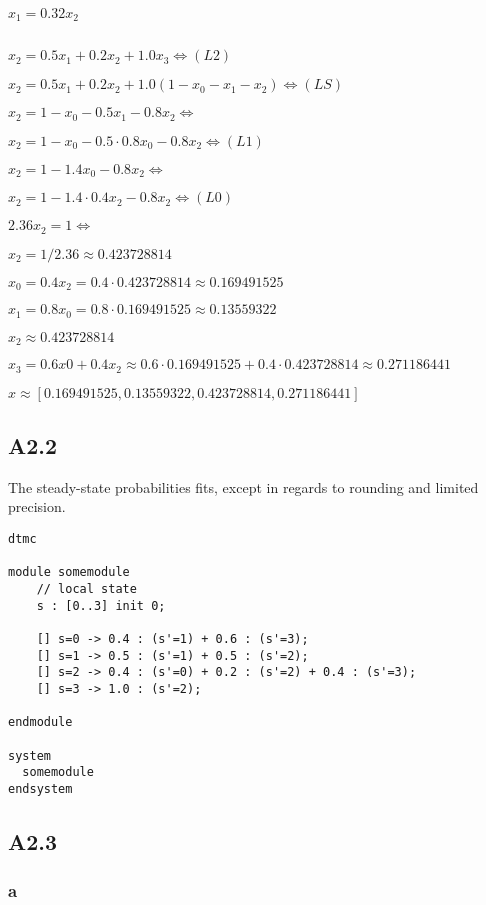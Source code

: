 $x_1 = 0.32x_2$

$ $

$x_2 = 0.5x_1 + 0.2x_2 + 1.0x_3 \Leftrightarrow   (L2)$

$x_2 = 0.5x_1 + 0.2x_2 + 1.0(1 - x_0 - x_1 - x_2) \Leftrightarrow   (LS)$

$x_2 = 1 - x_0 - 0.5x_1 - 0.8x_2 \Leftrightarrow$

$x_2 = 1 - x_0 - 0.5\cdot0.8x_0 - 0.8x_2 \Leftrightarrow   (L1)$

$x_2 = 1 - 1.4x_0 - 0.8x_2 \Leftrightarrow$

$x_2 = 1 - 1.4\cdot0.4x_2 - 0.8x_2 \Leftrightarrow   (L0)$

$2.36x_2 = 1 \Leftrightarrow$

$x_2 = 1/2.36 \approx 0.423728814$

$x_0 = 0.4x_2 = 0.4\cdot0.423728814 \approx 0.169491525$

$x_1 = 0.8x_0 = 0.8\cdot0.169491525 \approx 0.13559322$

$x_2 \approx 0.423728814$

$x_3 = 0.6x0 + 0.4x_2 \approx 0.6\cdot0.169491525 + 0.4\cdot0.423728814 \approx 0.271186441$

$x \approx [0.169491525, 0.13559322, 0.423728814, 0.271186441]$

\subsection{A2.2}

The steady-state probabilities fits, except in regards to rounding
and limited precision.

\begin{verbatim}
dtmc

module somemodule
	// local state
	s : [0..3] init 0;
	
	[] s=0 -> 0.4 : (s'=1) + 0.6 : (s'=3);
	[] s=1 -> 0.5 : (s'=1) + 0.5 : (s'=2);
	[] s=2 -> 0.4 : (s'=0) + 0.2 : (s'=2) + 0.4 : (s'=3);
	[] s=3 -> 1.0 : (s'=2);
	
endmodule

system
  somemodule
endsystem
\end{verbatim}

\subsection{A2.3}

\subsubsection{a}

